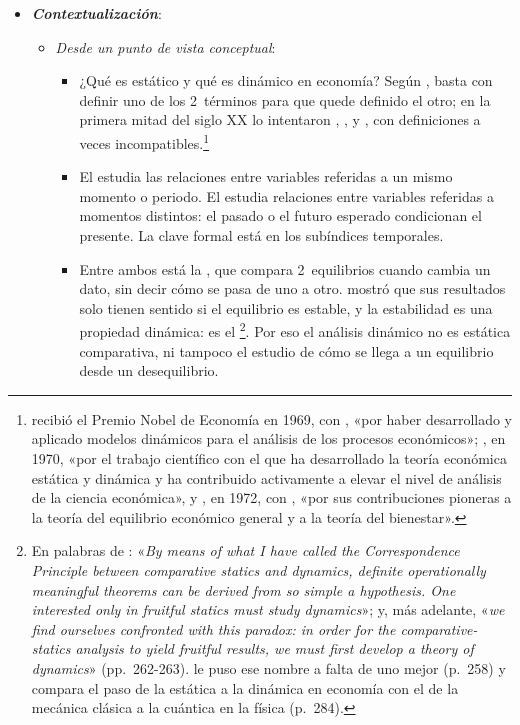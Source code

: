 \documentclass[11pt]{article}
\begin{document}
\begin{itemize}
\item \textbf{\emph{Contextualización}}:
  \begin{itemize}
  \item \emph{Desde un punto de vista conceptual}:
  \begin{itemize}
  \item ¿Qué es estático y qué es dinámico en economía? Según , basta con definir uno de los 2~términos para que quede definido el otro; en la primera mitad del siglo XX lo intentaron , ,  y , con definiciones a veces incompatibles.\footnote{ recibió el Premio Nobel de Economía en 1969, con , «por haber desarrollado y aplicado modelos dinámicos para el análisis de los procesos económicos»\nocite{Nobel1969}; , en 1970, «por el trabajo científico con el que ha desarrollado la teoría económica estática y dinámica y ha contribuido activamente a elevar el nivel de análisis de la ciencia económica»\nocite{Nobel1970Samuelson}, y , en 1972, con , «por sus contribuciones pioneras a la teoría del equilibrio económico general y a la teoría del bienestar»\nocite{Nobel1972HicksArrow}.}
  \item El  estudia las relaciones entre variables referidas a un mismo momento o periodo. El  estudia relaciones entre variables referidas a momentos distintos: el pasado o el futuro esperado condicionan el presente. La clave formal está en los subíndices temporales.
  \item Entre ambos está la , que compara 2~equilibrios cuando cambia un dato, sin decir cómo se pasa de uno a otro. \textcite{Samuelson1947Foundations} mostró que sus resultados solo tienen sentido si el equilibrio es estable, y la estabilidad es una propiedad dinámica: es el \footnote{En palabras de \textcite[p.~5]{Samuelson1947Foundations}: «\emph{By means of what I have called the Correspondence Principle between comparative statics and dynamics, definite operationally meaningful theorems can be derived from so simple a hypothesis. One interested only in fruitful statics must study dynamics}»; y, más adelante, «\emph{we find ourselves confronted with this paradox: in order for the comparative-statics analysis to yield fruitful results, we must first develop a theory of dynamics}» (pp.~262-263).  le puso ese nombre a falta de uno mejor (p.~258) y compara el paso de la estática a la dinámica en economía con el de la mecánica clásica a la cuántica en la física (p.~284).}. Por eso el análisis dinámico no es estática comparativa, ni tampoco el estudio de cómo se llega a un equilibrio desde un desequilibrio.

\end{itemize}
\end{itemize}
\end{itemize}
\end{document}
